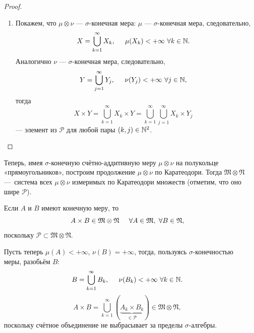 \begin{proof}
\begin{enumerate}
        Теперь интегрируем по $X$:
        \[\int_X I_x d\mu(x) = \mu(A) \nu(B) = (*)\]
        С другой стороны,
        \begin{multline*}
            \int_X I_x d\mu(x)
            = \int_X \sum\limits_{k=1}^{\infty} \chi_{A_k}(x) \nu(B_k) d\mu(x)
            = \text{(по теореме Беппо Леви)}
            =\\=
            \sum\limits_{k=1}^{\infty} \int_X \chi_{A_k} \nu(B_k)d \mu(x)
            = \sum\limits_{k=1}^{\infty} \mu(A_k) \nu(B_k)
            = \sum\limits_{k=1}^{\infty} \mu \otimes \nu(A_k \times B_k) = (*),
        \end{multline*} 
        следовательно, доказана счётная аддитивность $\mu \otimes \nu$.
        \item Покажем, что $\mu \otimes \nu$ — $\sigma$-конечная мера:
        $\mu$ — $\sigma$-конечная мера, следовательно,
        \[X = \bigcup\limits_{k=1}^{\infty} X_k, \hspace*{.5cm} \mu(X_k) < +\infty \ \forall k \in \mathbb{N}.\]
        Аналогично $\nu$ — $\sigma$-конечная мера, следовательно,
        \[Y = \bigcup\limits_{j=1}^{\infty} Y_j, \hspace*{.5cm} \nu(Y_j) < +\infty \ \forall j \in \mathbb{N},\]
        тогда
        \[X \times Y = \bigcup\limits_{k=1}^{\infty} X_k \times Y = \bigcup\limits_{k=1}^{\infty} \bigcup\limits_{j=1}^{\infty} X_k \times Y_j\]
        — элемент из $\mathcal{P}$ для любой пары $(k,j) \in \mathbb{N}^2$.
    \end{enumerate}
\end{proof} 

Теперь, имея $\sigma$-конечную счётно-аддитивную меру $\mu \otimes \nu$ на полукольце «прямоугольников», построим продолжение $\mu \otimes \nu$ по Каратеодори.
Тогда $\mathfrak{M} \otimes \mathfrak{N}$ — система всех $\mu \otimes \nu$ измеримых по Каратеодори множеств (отметим, что оно шире $\mathcal{P}$).

\begin{remark}
    Если $A$ и $B$ имеют конечную меру, то
    \[A \times B \in \mathfrak{M} \otimes \mathfrak{N} \tab \forall A \in \mathfrak{M}, \ \forall B \in \mathfrak{N},\]
    поскольку $\mathcal{P} \subset \mathfrak{M} \otimes \mathfrak{N}$.
\end{remark}

\begin{remark}
    Пусть теперь $\mu(A) < +\infty$, $\nu(B) = +\infty$, тогда, пользуясь $\sigma$-конечностью меры, разобьём $B$:
    \[B = \bigcup\limits_{k=1}^{\infty} B_k, \hspace*{.5cm} \nu(B_k) < +\infty \ \forall k \in \mathbb{N}.\]
    \[A \times B = \bigcup\limits_{k=1}^{\infty} (\underbrace{A_k \times B_k}_{\in \mathcal{P}}) \in \mathfrak{M} \otimes \mathfrak{N},\]
    поскольку счётное объединение не выбрасывает за пределы $\sigma$-алгебры.
\end{remark}

